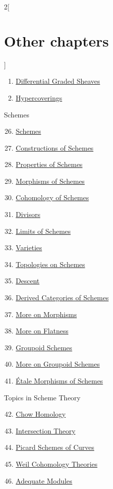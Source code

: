 \begin{multicols}{2}[\section{Other chapters}]
\begin{enumerate}
\item \hyperref[sdga-section-phantom]{Differential Graded Sheaves}
\item \hyperref[hypercovering-section-phantom]{Hypercoverings}
\end{enumerate}
Schemes
\begin{enumerate}
\setcounter{enumi}{25}
\item \hyperref[schemes-section-phantom]{Schemes}
\item \hyperref[constructions-section-phantom]{Constructions of Schemes}
\item \hyperref[properties-section-phantom]{Properties of Schemes}
\item \hyperref[morphisms-section-phantom]{Morphisms of Schemes}
\item \hyperref[coherent-section-phantom]{Cohomology of Schemes}
\item \hyperref[divisors-section-phantom]{Divisors}
\item \hyperref[limits-section-phantom]{Limits of Schemes}
\item \hyperref[varieties-section-phantom]{Varieties}
\item \hyperref[topologies-section-phantom]{Topologies on Schemes}
\item \hyperref[descent-section-phantom]{Descent}
\item \hyperref[perfect-section-phantom]{Derived Categories of Schemes}
\item \hyperref[more-morphisms-section-phantom]{More on Morphisms}
\item \hyperref[flat-section-phantom]{More on Flatness}
\item \hyperref[groupoids-section-phantom]{Groupoid Schemes}
\item \hyperref[more-groupoids-section-phantom]{More on Groupoid Schemes}
\item \hyperref[etale-section-phantom]{\'Etale Morphisms of Schemes}
\end{enumerate}
Topics in Scheme Theory
\begin{enumerate}
\setcounter{enumi}{41}
\item \hyperref[chow-section-phantom]{Chow Homology}
\item \hyperref[intersection-section-phantom]{Intersection Theory}
\item \hyperref[pic-section-phantom]{Picard Schemes of Curves}
\item \hyperref[weil-section-phantom]{Weil Cohomology Theories}
\item \hyperref[adequate-section-phantom]{Adequate Modules}

\end{enumerate}
\end{multicols}
